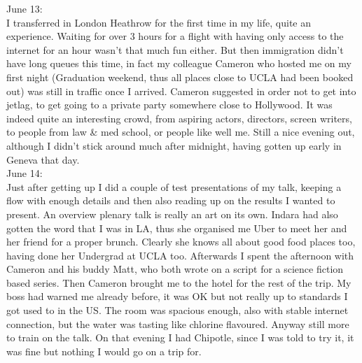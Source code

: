 June 13:\\
I transferred in London Heathrow for the first time in my life, quite an experience. Waiting for over 3 hours for a flight with having only access to the internet for an hour wasn't that much fun either. But then immigration didn't have long queues this time, in fact my colleague Cameron who hosted me on my first night (Graduation weekend, thus all places close to UCLA had been booked out) was still in traffic once I arrived. Cameron suggested in order not to get into jetlag, to get going to a private party somewhere close to Hollywood. It was indeed quite an interesting crowd, from aspiring actors, directors, screen writers, to people from law \& med school, or people like well me. Still a nice evening out, although I didn't stick around much after midnight, having gotten up early in Geneva that day.\\

June 14:\\
Just after getting up I did a couple of test presentations of my talk, keeping a flow with enough details and then also reading up on the results I wanted to present. An overview plenary talk is really an art on its own. Indara had also gotten the word that I was in LA, thus she organised me Uber to meet her and her friend for a proper brunch. Clearly she knows all about good food places too, having done her Undergrad at UCLA too. Afterwards I spent the afternoon with Cameron and his buddy Matt, who both wrote on a script for a science fiction based series. Then Cameron brought me to the hotel for the rest of the trip. My boss had warned me already before, it was OK but not really up to standards I got used to in the US. The room was spacious enough, also with stable internet connection, but the water was tasting like chlorine flavoured. Anyway still more to train on the talk. On that evening I had Chipotle, since I was told to try it, it was fine but nothing I would go on a trip for.\\

